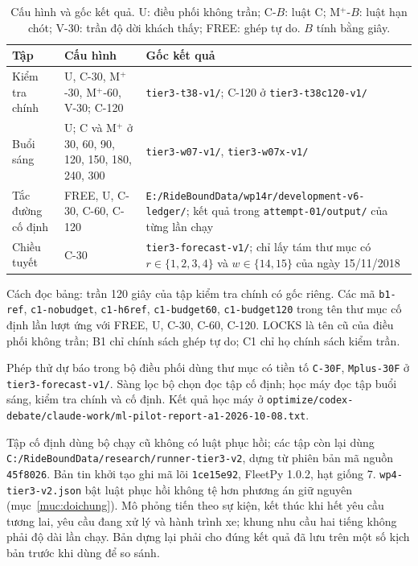 \begin{table}[htbp]
\centering
\caption{Cấu hình và gốc kết quả. U: điều phối không trần; C-$B$: luật C; M$^+$-$B$: luật hạn chót; V-30: trần độ dời khách thấy; FREE: ghép tự do. $B$ tính bằng giây.}
\label{bang:pl-goc}
\begin{tabular}{@{}p{2.8cm}p{5.2cm}p{6.8cm}@{}}
\toprule
\textbf{Tập} & \textbf{Cấu hình} & \textbf{Gốc kết quả} \\
\midrule
Kiểm tra chính & U, C-30, M$^+$-30, M$^+$-60, V-30; C-120 & \nolinkurl{tier3-t38-v1/}; C-120 ở \nolinkurl{tier3-t38c120-v1/} \\
Buổi sáng & U; C và M$^+$ ở 30, 60, 90, 120, 150, 180, 240, 300 & \nolinkurl{tier3-w07-v1/}, \nolinkurl{tier3-w07x-v1/} \\
Tắc đường cố định & FREE, U, C-30, C-60, C-120 & \nolinkurl{E:/RideBoundData/wp14r/development-v6-ledger/}; kết quả trong \nolinkurl{attempt-01/output/} của từng lần chạy \\
Chiều tuyết & C-30 & \nolinkurl{tier3-forecast-v1/}; chỉ lấy tám thư mục có $r\in\{1,2,3,4\}$ và $w\in\{14,15\}$ của ngày 15/11/2018 \\
\bottomrule
\end{tabular}
\end{table}

Cách đọc bảng: trần 120 giây của tập kiểm tra chính có gốc riêng. Các mã \nolinkurl{b1-ref}, \nolinkurl{c1-nobudget}, \nolinkurl{c1-h6ref}, \nolinkurl{c1-budget60}, \nolinkurl{c1-budget120} trong tên thư mục cố định lần lượt ứng với FREE, U, C-30, C-60, C-120. LOCKS là tên cũ của điều phối không trần; B1 chỉ chính sách ghép tự do; C1 chỉ họ chính sách kiểm trần.

Phép thử dự báo trong bộ điều phối dùng thư mục có tiền tố \texttt{C-30F}, \texttt{Mplus-30F} ở \nolinkurl{tier3-forecast-v1/}. Sàng lọc bộ chọn đọc tập cố định; học máy đọc tập buổi sáng, kiểm tra chính và cố định. Kết quả học máy ở \nolinkurl{optimize/codex-debate/claude-work/ml-pilot-report-a1-2026-10-08.txt}.

Tập cố định dùng bộ chạy cũ không có luật phục hồi; các tập còn lại dùng \nolinkurl{C:/RideBoundData/research/runner-tier3-v2}, dựng từ phiên bản mã nguồn \texttt{45f8026}. Bản tin khởi tạo ghi mã lõi \texttt{1ce15e92}, FleetPy 1.0.2, hạt giống 7. \nolinkurl{wp4-tier3-v2.json} bật luật phục hồi không tệ hơn phương án giữ nguyên (mục~\ref{muc:doichung}). Mô phỏng tiến theo sự kiện, kết thúc khi hết yêu cầu tương lai, yêu cầu đang xử lý và hành trình xe; khung nhu cầu hai tiếng không phải độ dài lần chạy. Bản dựng lại phải cho đúng kết quả đã lưu trên một số kịch bản trước khi dùng để so sánh.

